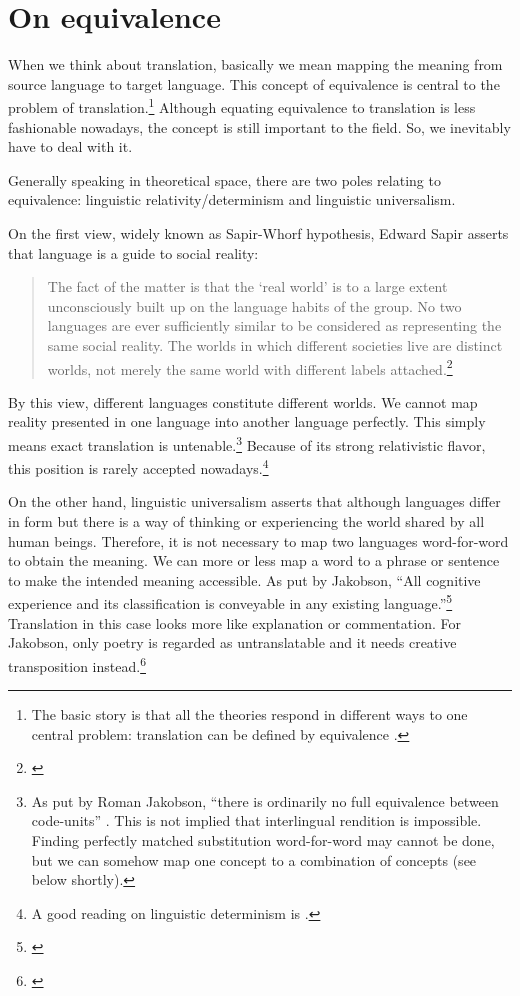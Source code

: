 \chapter{On equivalence}\label{chap:equivalence}

When we think about translation, basically we mean mapping the meaning from source language to target language. This concept of equivalence is central to the problem of translation.\footnote{The basic story is that all the theories respond in different ways to one central problem: translation can be defined by equivalence \citep[p.~xiii]{pym:exploring}.} Although equating equivalence to translation is less fashionable nowadays, the concept is still important to the field. So, we inevitably have to deal with it.

Generally speaking in theoretical space, there are two poles relating to equivalence: linguistic relativity/determinism and linguistic universalism.

On the first view, widely known as Sapir-Whorf hypothesis, Edward Sapir asserts that language is a guide to social reality:

\begin{quote}
The fact of the matter is that the `real world' is to a large extent unconsciously built up on the language habits of the group. No two languages are ever sufficiently similar to be considered as representing the same social reality. The worlds in which different societies live are distinct worlds, not merely the same world with different labels attached.\footnote{\citealp[p.~69]{sapir:culture}}
\end{quote}

By this view, different languages constitute different worlds. We cannot map reality presented in one language into another language perfectly. This simply means exact translation is untenable.\footnote{As put by Roman Jakobson, ``there is ordinarily no full equivalence between code-units'' \citep[p.~127]{jakobson:translation}. This is not implied that interlingual rendition is impossible. Finding perfectly matched substitution word-for-word may cannot be done, but we can somehow map one concept to a combination of concepts (see below shortly).} Because of its strong relativistic flavor, this position is rarely accepted nowadays.\footnote{A good reading on linguistic determinism is \citealp[pp.~124--51]{pinker:stuff}.}

On the other hand, linguistic universalism asserts that although languages differ in form but there is a way of thinking or experiencing the world shared by all human beings. Therefore, it is not necessary to map two languages word-for-word to obtain the meaning. We can more or less map a word to a phrase or sentence to make the intended meaning accessible. As put by Jakobson, ``All cognitive experience and its classification is conveyable in any existing language.''\footnote{\citealp[p.~128]{jakobson:translation}} Translation in this case looks more like explanation or commentation. For Jakobson, only poetry is regarded as untranslatable and it needs creative transposition instead.\footnote{\citealp[p.~131]{jakobson:translation}}


